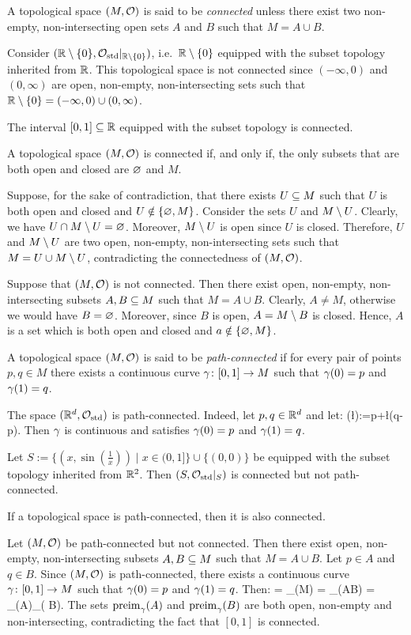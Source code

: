 \bd
A topological space $(M,\mathcal{O})$ is said to be \emph{connected} unless there exist two non-empty, non-intersecting open sets $A$ and $B$ such that $M=A\cup B$.
\ed

\be
Consider $(\mathbb{R}\setminus \{0\},\mathcal{O}_\mathrm{std}|_{\mathbb{R}\setminus\{0\}})$, i.e.\ $\mathbb{R}\setminus\{0\}$ equipped with the subset topology inherited from $\mathbb{R}$. This topological space is not connected since $(-\infty,0)$ and $(0,\infty)$ are open, non-empty, non-intersecting sets such that $\mathbb{R}\setminus\{0\}=(-\infty,0) \cup (0,\infty)$.
\ee

\bt
The interval $[0,1]\subseteq\mathbb{R}$ equipped with the subset topology is connected.
\et

\bt
A topological space $(M,\mathcal{O})$ is connected if, and only if, the only subsets that are both open and closed are $\varnothing$ and $M$.
\et

\bq
\ben
\item[($\imp$)] Suppose, for the sake of contradiction, that there exists $U\subseteq M$ such that $U$ is both open and closed and $U\notin\{\varnothing,M\}$. Consider the sets $U$ and $M\setminus U$. Clearly, we have $U \cap M\setminus U = \varnothing$. Moreover, $M\setminus U$ is open since $U$ is closed. Therefore, $U$ and $M\setminus U$ are two open, non-empty, non-intersecting sets such that $M = U \cup M \setminus U$, contradicting the connectedness of $(M,\mathcal{O})$.
\item[($\Leftarrow$)] Suppose that $(M,\mathcal{O})$ is not connected. Then there exist open, non-empty, non-intersecting subsets $A,B\subseteq M$ such that $M=A\cup B$. Clearly, $A \neq M$, otherwise we would have $B=\varnothing$. Moreover, since $B$ is open, $A=M\setminus B$ is closed. Hence, $A$ is a set which is both open and closed and $a \notin \{\varnothing,M\}$.\qedhere
\een
\eq

\bd
A topological space $(M,\mathcal{O})$ is said to be \emph{path-connected} if for every pair of points $p,q\in M$ there exists a continuous curve $\gamma\colon[0,1]\to M$ such that $\gamma(0)=p$ and $\gamma(1)=q$.
\ed

\be
The space $(\mathbb{R}^d,\mathcal{O}_\mathrm{std})$ is path-connected. Indeed, let $p,q\in\mathbb{R}^d$ and let:
\bse
\g(\l):=p+\l(q-p).
\ese
Then $\gamma$ is continuous and satisfies $\gamma(0)=p$ and $\gamma(1)=q$.
\ee

\be
Let $S:=\{(x,\sin(\tfrac{1}{x}))\mid x\in (0,1]\}\cup \{(0,0)\}$ be equipped with the subset topology inherited from $\mathbb{R}^2$. Then $(S,\mathcal{O}_\mathrm{std}|_S)$ is connected but not path-connected.
\ee

\bt
If a topological space is path-connected, then it is also connected.
\et

\bq
Let $(M,\mathcal{O})$ be path-connected but not connected. Then there exist open, non-empty, non-intersecting subsets $A,B\subseteq M$ such that $M=A\cup B$. Let $p \in A$ and $q \in B$. Since $(M,\mathcal{O})$ is path-connected, there exists a continuous curve $\gamma\colon[0,1]\to M$ such that $\gamma(0)=p$ and $\gamma(1)=q$. Then:
\bse
[0,1] = _\g(M) =  _\g(A\cup B) =  _\g(A)\cup  {}_\g( B).
\ese
The sets $\mathrm{preim}_\gamma(A)$ and $ \mathrm{preim}_\gamma( B)$ are both open, non-empty and non-intersecting, contradicting the fact that $[0,1]$ is connected.
\eq

